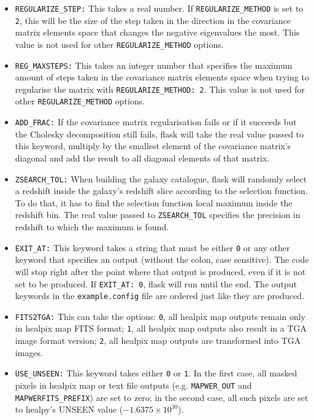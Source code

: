 \documentclass[12pt]{book} %
\begin{document}
\begin{itemize}
\item {\tt REGULARIZE\_STEP:} This takes a real number. If {\tt REGULARIZE\_METHOD} is set to {\tt 2},
  this will be the size of the step taken in the direction in the covariance matrix elements space that 
  changes the negative eigenvalues the most.  This value is not used for other {\tt REGULARIZE\_METHOD} 
  options.
  
\item {\tt REG\_MAXSTEPS:} This takes an integer number that specifies the maximum amount of 
  steps taken in the covariance matrix elements space when trying to regularise the matrix 
  with {\tt REGULARIZE\_METHOD: 2}. This value is not used for other {\tt REGULARIZE\_METHOD} 
  options. 

\item {\tt ADD\_FRAC:} If the covariance matrix regularisation fails or if it succeeds but the 
  Cholesky decomposition still fails, {\sc flask} will take the real value passed to this keyword, 
  multiply by the smallest element of the covariance matrix's diagonal and add the result to all 
  diagonal elements of that matrix. 

\item {\tt ZSEARCH\_TOL:} When building the galaxy catalogue, {\sc flask} will randomly select 
  a redshift inside the galaxy's redshift slice according to the selection function. To do that, 
  it has to find the selection function local maximum inside the redshift bin. The real value 
  passed to {\tt ZSEARCH\_TOL} specifies the precision in redshift to which the maximum is found.

\item {\tt EXIT\_AT:} This keyword takes a string that must be either {\tt 0} or any other keyword
  that specifies an output (without the colon, case sensitive). The code will stop right after 
  the point where that output is produced, even if it is not set to be produced. If {\tt EXIT\_AT: 0}, 
  {\sc flask} will run until the end. The output keywords in the {\tt example.config} file 
  are ordered just like they are produced.

\item {\tt FITS2TGA:} This can take the options: {\tt 0}, all {\sc healpix} map outputs remain only 
  in {\sc healpix} map FITS format; {\tt 1}, all {\sc healpix} map outputs also result in a TGA
  image format version; {\tt 2}, all {\sc healpix} map outputs are transformed into TGA images.

\item {\tt USE\_UNSEEN:} This keyword takes either {\tt 0} or {\tt1}. In the first case, all masked 
  pixels in {\sc healpix} map or text file outputs (e.g. {\tt MAPWER\_OUT} and 
  {\tt MAPWERFITS\_PREFIX}) are set to zero; in the second case, all such pixels are 
  set to {\sc healpy}'s UNSEEN value ($-1.6375\times10^{30}$).


\end{itemize}
\end{document}
